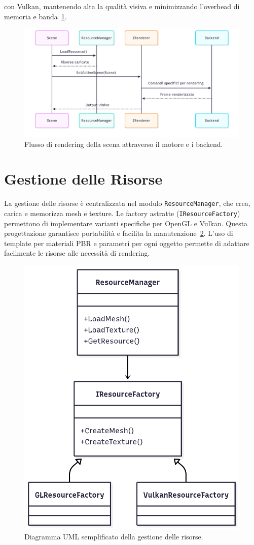 \documentclass[12pt,a4paper,openright,twoside]{book}
\begin{document}
con Vulkan, mantenendo alta la qualità visiva e minimizzando l'overhead di memoria e banda~\ref{fig:uml-activity-rendering}.
\begin{figure}[H]
    \centering
    \includegraphics[width=.8\linewidth]{figures/uml_activity_rendering.png}
    \caption{Flusso di rendering della scena attraverso il motore e i backend.}
    \label{fig:uml-activity-rendering}
\end{figure}

\section{Gestione delle Risorse}
La gestione delle risorse è centralizzata nel modulo \texttt{ResourceManager}, che crea, carica e memorizza mesh e
texture. Le factory astratte (\texttt{IResourceFactory}) permettono di implementare varianti specifiche per OpenGL e Vulkan.
Questa progettazione garantisce portabilità e facilita la manutenzione~\ref{fig:uml-resources}. L’uso di template per
materiali PBR e parametri per ogni oggetto permette di adattare facilmente le risorse alle necessità di rendering.
\begin{figure}[H]
    \centering
    \includegraphics[width=.6\linewidth]{figures/uml_resources.png}
    \caption{Diagramma UML semplificato della gestione delle risorse.}
    \label{fig:uml-resources}
\end{figure}
\end{document}
